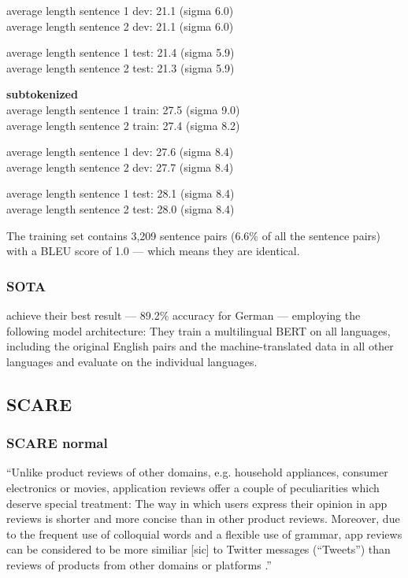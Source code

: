 average length sentence 1 dev: 21.1 (sigma 6.0) \\
average length sentence 2 dev: 21.1 (sigma 6.0)

average length sentence 1 test: 21.4 (sigma 5.9) \\
average length sentence 2 test: 21.3 (sigma 5.9)

\textbf{subtokenized} \\
average length sentence 1 train: 27.5 (sigma 9.0) \\
average length sentence 2 train: 27.4 (sigma 8.2)

average length sentence 1 dev: 27.6 (sigma 8.4) \\
average length sentence 2 dev: 27.7 (sigma 8.4)

average length sentence 1 test: 28.1 (sigma 8.4) \\
average length sentence 2 test: 28.0 (sigma 8.4)


The training set contains 3,209 sentence pairs (6.6\% of all the sentence pairs) with a BLEU score 
of 1.0 --- which means they are identical.


\subsubsection{SOTA}

\cite{yang2019paws} achieve their best result --- 89.2\% accuracy for German --- employing the 
following model architecture:
They train a multilingual BERT on all languages, including the original English pairs and the 
machine-translated data in all other languages and evaluate on the individual languages.

\subsection{SCARE}

\subsubsection{SCARE normal}

``Unlike product reviews of other domains, e.g. household appliances, consumer electronics or 
movies, application reviews offer a couple of peculiarities which deserve special treatment:
The way in which users express their opinion in app reviews is shorter and more concise than in 
other product reviews.
Moreover, due to the frequent use of colloquial words and a flexible use of grammar, app reviews 
can be considered to be more similiar [sic] to Twitter messages (“Tweets”) than reviews of 
products from other domains or platforms \textelp{}.'' \citep[p.~1114]{sanger2016scare}


